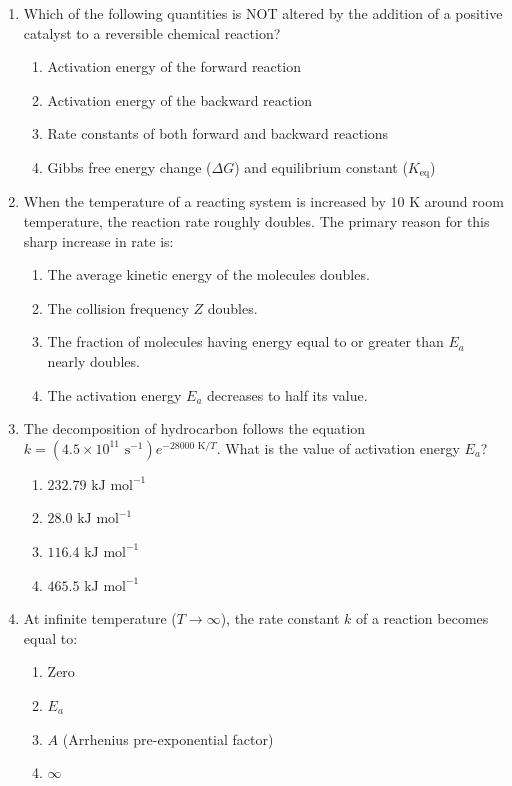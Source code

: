 \documentclass[11pt, a4paper]{article}
\begin{document}
\begin{enumerate}
\item Which of the following quantities is NOT altered by the addition of a positive catalyst to a reversible chemical reaction?
\begin{enumerate}
    \item Activation energy of the forward reaction
    \item Activation energy of the backward reaction
    \item Rate constants of both forward and backward reactions
    \item Gibbs free energy change ($\Delta G$) and equilibrium constant ($K_{\text{eq}}$)
\end{enumerate}

\item When the temperature of a reacting system is increased by $10\text{ K}$ around room temperature, the reaction rate roughly doubles. The primary reason for this sharp increase in rate is:
\begin{enumerate}
    \item The average kinetic energy of the molecules doubles.
    \item The collision frequency $Z$ doubles.
    \item The fraction of molecules having energy equal to or greater than $E_a$ nearly doubles.
    \item The activation energy $E_a$ decreases to half its value.
\end{enumerate}

\item The decomposition of hydrocarbon follows the equation $k = (4.5 \times 10^{11}\text{ s}^{-1}) e^{-28000\text{ K}/T}$. What is the value of activation energy $E_a$?
\begin{enumerate}
    \item $232.79\text{ kJ mol}^{-1}$
    \item $28.0\text{ kJ mol}^{-1}$
    \item $116.4\text{ kJ mol}^{-1}$
    \item $465.5\text{ kJ mol}^{-1}$
\end{enumerate}

\item At infinite temperature ($T \rightarrow \infty$), the rate constant $k$ of a reaction becomes equal to:
\begin{enumerate}
    \item Zero
    \item $E_a$
    \item $A$ (Arrhenius pre-exponential factor)
    \item $\infty$
\end{enumerate}


\end{enumerate}
\end{document}
